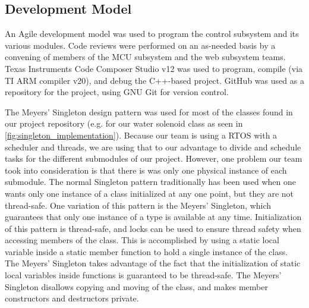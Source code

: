 \documentclass[journal]{IEEEtran}
\begin{document}
\subsection{Development Model}
An Agile development model was used to program the control subsystem and its various modules. Code reviews were performed on an as-needed basis by a convening of members of the MCU subsystem and the web subsystem teams. Texas Instruments Code Composer Studio v12 was used to program, compile (via TI ARM compiler v20), and debug the C++-based project. GitHub was used as a repository for the project, using GNU Git for version control.

The Meyers' Singleton design pattern was used for most of the classes found in our project repository (e.g. for our water solenoid class as seen in \ref{fig:singleton_implementation}). Because our team is using a RTOS with a scheduler and threads, we are using that to our advantage to divide and schedule tasks for the different submodules of our project. However, one problem our team took into consideration is that there is was only one physical instance of each submodule. The normal Singleton pattern traditionally has been used when one wants only one instance of a class initialized at any one point, but they are not thread-safe. One variation of this pattern is the Meyers' Singleton, which guarantees that only one instance of a type is available at any time. Initialization of this pattern is thread-safe, and locks can be used to ensure thread safety when accessing members of the class. This is accomplished by using a static local variable inside a static member function to hold a single instance of the class. The Meyers' Singleton takes advantage of the fact that the initialization of static local variables inside functions is guaranteed to be thread-safe. The Meyers' Singleton disallows copying and moving of the class, and makes member constructors and destructors private\cite{Meyers}.

\lstset{style=mystyle}
\end{document}
